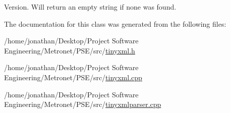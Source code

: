 Version. Will return an empty string if none was found. 



The documentation for this class was generated from the following files\+:\begin{DoxyCompactItemize}
\item 
/home/jonathan/\+Desktop/\+Project Software Engineering/\+Metronet/\+P\+S\+E/src/\hyperlink{tinyxml_8h}{tinyxml.\+h}\item 
/home/jonathan/\+Desktop/\+Project Software Engineering/\+Metronet/\+P\+S\+E/src/\hyperlink{tinyxml_8cpp}{tinyxml.\+cpp}\item 
/home/jonathan/\+Desktop/\+Project Software Engineering/\+Metronet/\+P\+S\+E/src/\hyperlink{tinyxmlparser_8cpp}{tinyxmlparser.\+cpp}\end{DoxyCompactItemize}
